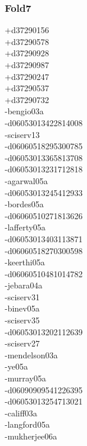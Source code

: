 \begin{multicols}{3}
\subsubsection*{Fold7}
+d37290156\\
+d37290578\\
+d37290928\\
+d37290987\\
+d37290247\\
+d37290537\\
+d37290732\\
-bengio03a\\
-d06053013422814008\\
-sciserv13\\
-d06060518295300785\\
-d06053013365813708\\
-d06053013231712818\\
-agarwal05a\\
-d06053013245412933\\
-bordes05a\\
-d06060510271813626\\
-lafferty05a\\
-d06053013403113871\\
-d06060518270300598\\
-keerthi05a\\
-d06060510481014782\\
-jebara04a\\
-sciserv31\\
-binev05a\\
-sciserv35\\
-d06053013202112639\\
-sciserv27\\
-mendelson03a\\
-ye05a\\
-murray05a\\
-d06090909541226395\\
-d06053013254713021\\
-califf03a\\
-langford05a\\
-mukherjee06a\\

\end{multicols}
